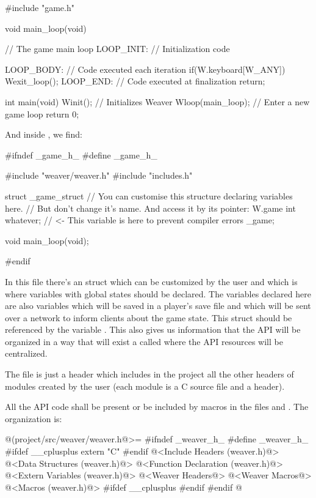 \alinhaverbatim
#include "game.h"

void main_loop(void){ // The game main loop
 LOOP_INIT: // Initialization code 

 LOOP_BODY: // Code executed each iteration
    if(W.keyboard[W_ANY])
        Wexit_loop();
 LOOP_END: // Code executed at finalization
    return;
}

int main(void){
  Winit(); // Initializes Weaver
  Wloop(main_loop); // Enter a new game loop
  return 0;
}
\alinhanormal

And inside , we find:

\alinhaverbatim
#ifndef _game_h_
#define _game_h_

#include "weaver/weaver.h"
#include "includes.h"

struct _game_struct{
  // You can customise this structure declaring variables here.
  // But don't change it's name. And access it by its pointer: W.game
  int whatever; // <- This variable is here to prevent compiler errors
} _game;

void main_loop(void);

#endif
\alinhanormal

In this file there's an struct which can be customized by the user and
which is where variables with global states should be declared. The
variables declared here are also variables which will be saved in a
player's save file and which will be sent over a network to inform
clients about the game state. This struct should be referenced by the
variable . This also gives us information that the
API will be organized in a way that will exist a 
called  where the API resources will be centralized.

The file  is just a header which includes in
the project all the other headers of modules created by the user (each
module is a C source file and a header).

All the API code shall be present or be included by macros in the
files  and . The
 organization is:

\iniciocodigo
@(project/src/weaver/weaver.h@>=
#ifndef _weaver_h_
#define _weaver_h_
#ifdef __cplusplus
  extern "C" {
#endif
@<Include Headers (weaver.h)@>
@<Data Structures (weaver.h)@>
@<Function Declaration (weaver.h)@>
@<Extern Variables (weaver.h)@>
@<Weaver Headers@>
@<Weaver Macros@>
@<Macros (weaver.h)@>
#ifdef __cplusplus
  }
#endif
#endif
@
\fimcodigo


